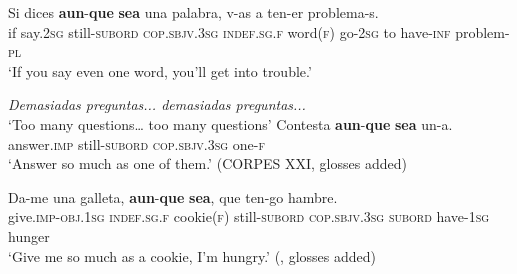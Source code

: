 \begin{exe}
	\ex\label{exAppendixSpanishAunqueSea1}
	\gll Si dices \textbf{aun}-\textbf{que} \textbf{sea} una palabra, v-as a ten-er problema-s.\\
	if say.2\textsc{sg} still-\textsc{subord} \textsc{cop}.\textsc{sbjv}.3\textsc{sg} \textsc{indef}.\textsc{sg}.\textsc{f} word(\textsc{f}) go-2\textsc{sg} to have-\textsc{inf} problem-\textsc{pl}\\
	\glt \lq If you say even one word, you’ll get into trouble.\rq{ }\parencite[356]{GastvanderAuwera2011}
	
	\ex\label{exAppendixSpanishAunqueSea2}
	\begin{xlist}
		 \textit{Demasiadas preguntas... demasiadas preguntas...}
		\\ \lq Too many questions… too many questions\rq{}
		 \gll Contesta \textbf{aun}-\textbf{que} \textbf{sea} un-a.\\
		answer.\textsc{imp} still-\textsc{subord} \textsc{cop}.\textsc{sbjv}.3\textsc{sg} one-\textsc{f}\\
		\glt \lq Answer so much as one of them.\rq{ }(CORPES XXI, glosses added)
	\end{xlist} 
	
	\ex\label{exAppendixSpanishAunqueSea3}
	\gll Da-me una galleta, \textbf{aun}-\textbf{que} \textbf{sea}, que ten-go hambre.\\
	give.\textsc{imp}-\textsc{obj}.1\textsc{sg} \textsc{indef}.\textsc{sg}.\textsc{f} cookie(\textsc{f}) still-\textsc{subord} \textsc{cop}.\textsc{sbjv}.3\textsc{sg} \textsc{subord} have-1\textsc{sg} hunger\\
	\glt \lq Give me so much as a cookie, I'm hungry.\rq{ }(\cite[§47.12q]{RAEGramatica}, glosses added)
\end{exe}

